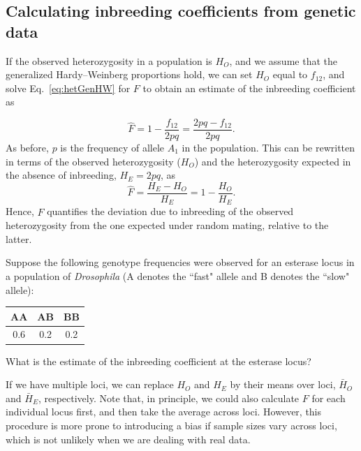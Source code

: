 {{\subsection{Calculating inbreeding coefficients from genetic data}


If the observed heterozygosity in a population is $H_O$, and we assume that the
generalized Hardy--Weinberg proportions hold, we can set $H_O$ equal to
$f_{12}$, and solve Eq.\ \eqref{eq:hetGenHW} for $F$ to obtain an estimate of
the inbreeding coefficient as

\begin{equation}
\hat{F} = 1-\frac{f_{12}}{2pq} = \frac{2pq - f_{12}}{2pq}.
\label{eqn:Fhat}
\end{equation}
As before, $p$ is the frequency of allele $A_{1}$ in the population. This can
be rewritten in terms of the observed heterozygosity ($H_O$) and the
heterozygosity expected in the absence of inbreeding, $H_E=2pq$, as
\begin{equation}
\hat{F} = \frac{H_E-H_O}{H_E} = 1 - \frac{H_O}{H_E}.
\label{eqn:FhatHO}
\end{equation}
Hence, $\hat{F}$ quantifies the deviation due to inbreeding of the observed heterozygosity from the one expected under random mating, relative to the latter.

\begin{question}{}
  Suppose the following genotype frequencies were observed for an esterase locus in a population of \textit{Drosophila} (A denotes the ``fast" allele and B denotes the ``slow" allele):
\begin{center}
\begin{tabular}{ccc}
\hline
AA &	AB &	BB\\
\hline
0.6 &	0.2 &	0.2\\
\end{tabular}
\end{center}
What is the estimate of the inbreeding coefficient at the esterase locus?
\end{question}

If we have multiple loci, we can replace $H_O$ and $H_E$ by their means
over loci, $\bar{H}_O$ and $\bar{H}_E$, respectively. Note that, in principle, we could also calculate $F$ for each individual locus first, and then take the average across loci. However, this procedure is more prone to introducing a bias if sample sizes vary across loci, which is not unlikely when we are dealing with real data.


}}
